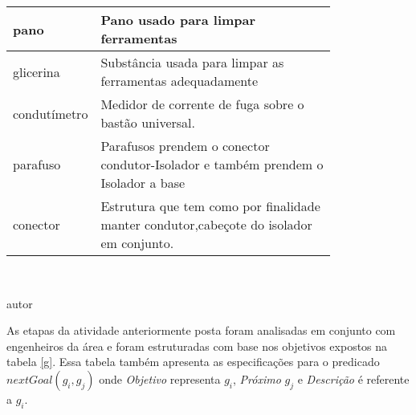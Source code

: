 \begin{table}[H]
\begin{tabular}{|l|p{0.8\linewidth}|}
pano & Pano usado para limpar ferramentas \\ \hline
glicerina & Substância usada para limpar as ferramentas adequadamente \\ \hline
condutímetro & Medidor de corrente de fuga sobre o bastão universal. \\ \hline
parafuso & Parafusos prendem o conector condutor-Isolador e também prendem o Isolador a base \\ \hline
conector & Estrutura que tem como por finalidade manter condutor,cabeçote do isolador em conjunto. \\ \hline
\end{tabular}
\label{artefacts}
\\
\begin{center}
autor
\end{center}
\end{table} 

As etapas da atividade anteriormente posta foram analisadas em conjunto com engenheiros da área e foram estruturadas com base nos objetivos expostos na tabela \ref{g}. Essa tabela também apresenta as especificações para o predicado $nextGoal(g_i,g_j)$ onde \textit{Objetivo} representa $g_i$, \textit{Próximo} $g_j$ e \textit{Descrição} é referente a $g_i$.

